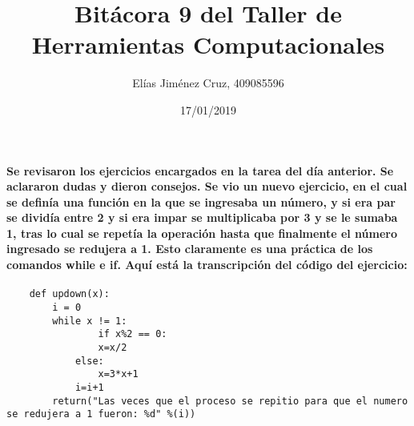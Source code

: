 \documentclass[letterpaper, 12pt, oneside]{article} %
\title{\Huge Bitácora 9 del Taller de Herramientas Computacionales}
\author{Elías Jiménez Cruz, 409085596}
\date{17/01/2019}
\begin{document}
	\maketitle
	\paragraph{Se revisaron los ejercicios encargados en la tarea del día anterior. Se aclararon dudas y dieron consejos. Se vio un nuevo ejercicio, en el cual se definía una función en la que se ingresaba un número, y si era par se dividía entre 2 y si era impar se multiplicaba por 3 y se le sumaba 1, tras lo cual se repetía la operación hasta que finalmente el número ingresado se redujera a 1. Esto claramente es una práctica de los comandos while e if. Aquí está la transcripción del código del ejercicio:}
	\begin{verbatim}
	def updown(x):
		i = 0
		while x != 1:
				if x%2 == 0:
				x=x/2
			else:
				x=3*x+1
			i=i+1
		return("Las veces que el proceso se repitio para que el numero se redujera a 1 fueron: %d" %(i))
	\end{verbatim}
\end{document}
